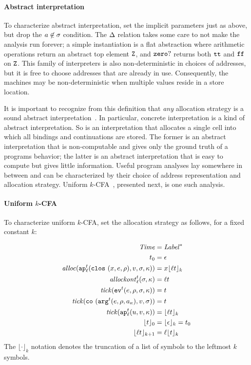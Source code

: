\documentclass[9pt]{sigplanconf} %
\begin{document}
\paragraph{Abstract interpretation} To characterize abstract
interpretation, set the implicit parameters just as above, but drop
the $\maddr \not\in \msto$ condition. The $\interpdelta$ relation takes some care
to not make the analysis run forever; a simple instantiation is a flat
abstraction where arithmetic operations return an abstract top element
$\sNum$, and $\szerohuh$ returns both $\strue$ and $\sfalse$ on
$\sNum$.  This family of interpreters is also non-deterministic in
choices of addresses, but it is free to choose addresses that are
already in use.  Consequently, the machines may be non-deterministic
when multiple values reside in a store location.

It is important to recognize from this definition that \emph{any}
allocation strategy is a sound abstract
interpretation~\cite{dvanhorn:Might2009Posteriori}.  In particular,
concrete interpretation is a kind of abstract interpretation.  So is
an interpretation that allocates a single cell into which all bindings
and continuations are stored.  The former is an abstract
interpretation that is non-computable and gives only the ground truth
of a programs behavior; the latter is an abstract interpretation
that is easy to compute but gives little information.  Useful program
analyses lay somewhere in between and can be characterized by their
choice of address representation and allocation strategy.  Uniform
\(k\)-CFA~\cite{dvanhorn:nielson-nielson-popl97}, presented next, is one such analysis.

\paragraph{Uniform \(k\)-CFA} To characterize uniform \(k\)-CFA, set the allocation
strategy as follows, for a fixed constant \(k\):

{\small
\begin{align*}
\Counter &= \Label^* \\
\mtcntr &= \epsilon \\
\alloc(\ap[^\mcntr_\mlab]{\clos{\mvar,\mexp,\menv},\mval,\msto,\mkont}) &= \mvar\kpush[_k]{\mlab\mcntr} \\
\allockont^\mcntr_\mlab(\msto,\mkont) &= \mlab\mcntr \\
\tick(\ev[^\mcntr]{\mexp,\menv,\msto,\mkont}) &= \mcntr \\
\tick(\co{\kar[^\mcntr]{\mexp,\menv,\mkaddr},\mval,\msto}) &= \mcntr \\
\tick(\ap[^\mcntr_\mlab]{\mvalx{u},\mval,\mkont}) &= \kpush[_k]{\mlab\mcntr} \\
  \kpush[_0]{\mcntr} &= \kpush[_k]{\epsilon} = \mtcntr \\
  \kpush[_{k+1}]{\mlab\mcntr} &= \mlab\kpush[_k]{\mcntr} \\
\end{align*}}
The \(\lfloor\cdot\rfloor_k\) notation denotes the truncation of a list
of symbols to the leftmost \(k\) symbols.
\end{document}
